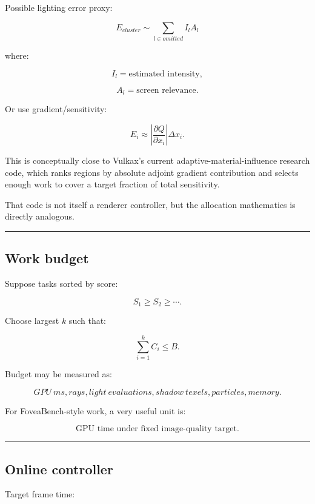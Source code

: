 Possible lighting error proxy:

\[
E_{cluster}
\sim
\sum_{l\in omitted}
I_l
A_l
\]

where:

\[
I_l=\text{estimated intensity},
\]

\[
A_l=\text{screen relevance}.
\]

Or use gradient/sensitivity:

\[
E_i
\approx
\left|
\frac{\partial Q}{\partial x_i}
\right|
\Delta x_i.
\]

This is conceptually close to Vulkax's current adaptive-material-influence research code, which ranks regions by absolute adjoint gradient contribution and selects enough work to cover a target fraction of total sensitivity.

That code is not itself a renderer controller, but the allocation mathematics is directly analogous.

\begin{center}\rule{0.5\linewidth}{0.5pt}\end{center}

\subsection{Work budget}\label{04-visual-computing-ii-ch040-work-budget}

Suppose tasks sorted by score:

\[
S_1\ge S_2\ge\cdots.
\]

Choose largest \(k\) such that:

\[
\boxed{
\sum_{i=1}^{k}C_i
\le B.
}
\]

Budget may be measured as:

\[
GPU\ ms,
rays,
light\ evaluations,
shadow\ texels,
particles,
memory.
\]

For FoveaBench-style work, a very useful unit is:

\[
\boxed{
\text{GPU time under fixed image-quality target}.
}
\]

\begin{center}\rule{0.5\linewidth}{0.5pt}\end{center}

\subsection{Online controller}\label{04-visual-computing-ii-ch040-online-controller}

Target frame time:

